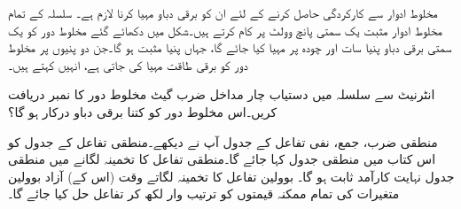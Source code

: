 مخلوط ادوار سے کارکردگی حاصل کرنے کے لئے ان  کو برقی دباو مہیا کرنا لازم ہے۔ سلسلہ   کے تمام مخلوط ادوار مثبت یک سمتی  پانچ وولٹ  پر کام کرتے ہیں۔شکل   میں دکھائے گئے مخلوط دور کو  یک سمتی برقی دباو پنیا    سات   اور چودہ   پر مہیا کیا جائے گا،  جہاں پنیا    مثبت  ہو گا۔جن دو پنیوں  پر مخلوط دور کو برقی طاقت مہیا کی جاتی ہے، انہیں   کہتے ہیں۔

انٹرنیٹ سے سلسلہ   میں دستیاب چار مداخل   ضرب گیٹ  مخلوط دور کا نمبر دریافت کریں۔اس مخلوط دور کو کتنا برقی دباو درکار ہو گا؟

منطقی ضرب، جمع، نفی  تفاعل کے جدول آپ نے دیکھے۔منطقی تفاعل کے  جدول کو اس کتاب میں منطقی جدول  کہا جائے گا۔منطقی تفاعل کا تخمینہ لگانے میں  منطقی جدول نہایت کارآمد ثابت ہو گا۔
بوولین تفاعل کا تخمینہ لگاتے وقت  (اس کے)  آزاد بوولین متغیرات کی تمام ممکنہ قیمتوں کو ترتیب وار لکھ کر تفاعل  حل کیا جائے گا۔


